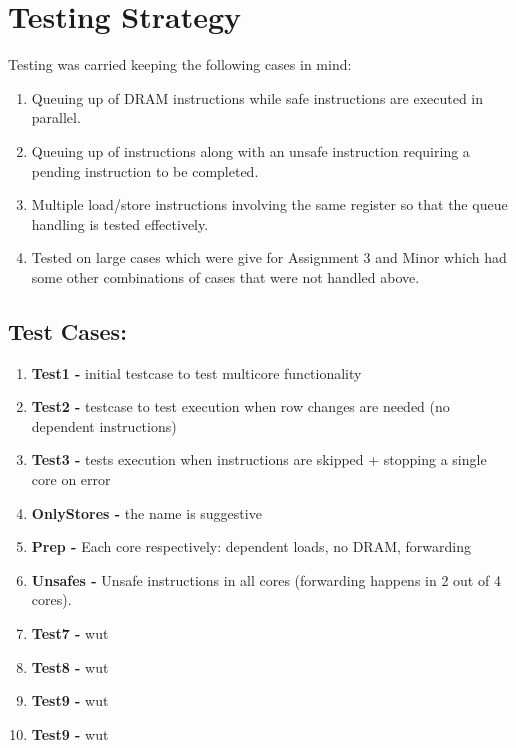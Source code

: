 \documentclass{article}
\begin{document}
\section{Testing Strategy}

Testing was carried keeping the following cases in mind:
\begin{enumerate}
    \item Queuing up of DRAM instructions while safe instructions are executed in parallel.
    \item Queuing up of instructions along with an unsafe instruction requiring a pending instruction to be completed.
    \item Multiple load/store instructions involving the same register so that the queue handling is tested effectively.
    \item Tested on large cases which were give for Assignment 3 and Minor which had some other combinations of cases that were not handled above.
\end{enumerate}
\subsection*{Test Cases:}
\begin{enumerate}
    \item \textbf{Test1 -} initial testcase to test multicore functionality
    \item \textbf{Test2 -} testcase to test execution when row changes are needed (no dependent instructions)
%
    \item \textbf{Test3 -} tests execution when instructions are skipped + stopping a single core on error
    \item \textbf{OnlyStores -} the name is suggestive %
%
    \item \textbf{Prep -} Each core respectively: dependent loads, no DRAM, forwarding
%
    \item \textbf{Unsafes -} Unsafe instructions in all cores (forwarding happens in 2 out of 4 cores).
%
    \item \textbf{Test7 -} wut
%
    \item \textbf{Test8 -} wut
%
    \item \textbf{Test9 -} wut
%
    \item \textbf{Test9 -} wut
\end{enumerate}
\end{document}

